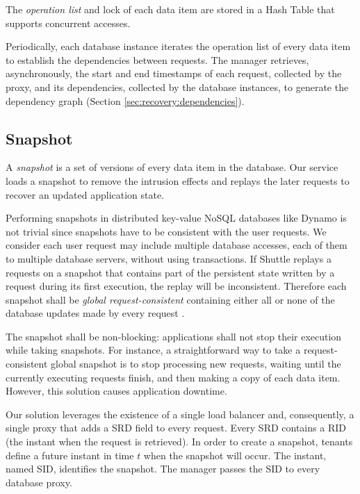 The \emph{operation list} and lock of each data item are stored in a Hash Table that supports concurrent accesses.

Periodically, each database instance iterates the operation list of every data item to establish the dependencies between requests. The manager retrieves, asynchronously, the start and end timestamps of each request, collected by the proxy, and its dependencies, collected by the database instances, to generate the dependency graph (Section \ref{sec:recovery:dependencies}).

\subsection{Snapshot}
\label{sec:architecture:snapshot}

A \emph{snapshot} is a set of versions of every data item in the database. Our service loads a snapshot to remove the intrusion effects and replays the later requests to recover an updated application state. 

Performing snapshots in distributed key-value NoSQL databases like Dynamo is not trivial since snapshots have to be consistent with the user requests. We consider each user request may include multiple database accesses, each of them to multiple database servers, without using transactions. 
If Shuttle replays a requests on a snapshot that contains part of the persistent state written by a request during its first execution, the replay will be inconsistent. Therefore each snapshot shall be \emph{global request-consistent} containing either all or none of the database updates made by every request \cite{checkpoint-survey}. 

The snapshot shall be non-blocking: applications shall not stop their execution while taking snapshots. For instance, a straightforward way to take a request-consistent global snapshot is to stop processing new requests, waiting until the currently executing requests finish, and then making a copy of each data item. However, this solution causes application downtime.

Our solution leverages the existence of a single load balancer and, consequently, a single proxy that adds a \acf{SRD} field to every request. Every \ac{SRD} contains a \ac{RID} (the instant when the request is retrieved). In order to create a snapshot, tenants define a future instant in time $t$ when the snapshot will occur. The instant, named \acf{SID}, identifies the snapshot. The manager passes the \ac{SID} to every database proxy.

